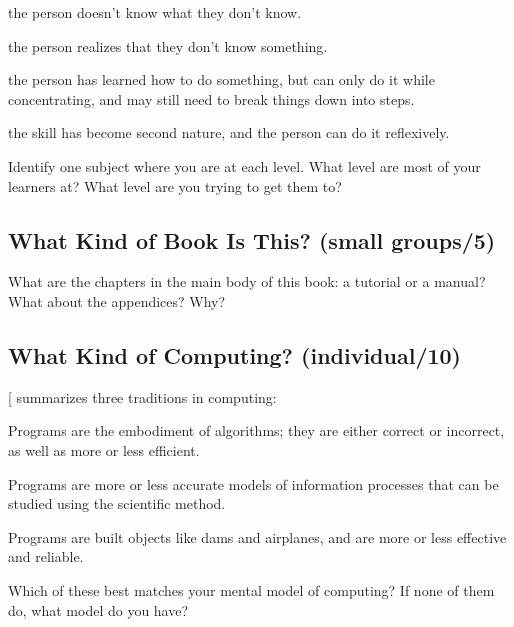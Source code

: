 \begin{description}
\tightlist
\item[Unconscious incompetence:]
the person doesn't know what they don't know.
\item[Conscious incompetence:]
the person realizes that they don't know something.
\item[Conscious competence:]
the person has learned how to do something, but can only do it while
concentrating, and may still need to break things down into steps.
\item[Unconscious competence:]
the skill has become second nature, and the person can do it
reflexively.
\end{description}

Identify one subject where you are at each level. What level are most of
your learners at? What level are you trying to get them to?

\subsection{What Kind of Book Is This? (small groups/5)}\label{what-kind-of-book-is-this-small-groups5}

What are the chapters in the main body of this book: a tutorial or a
manual? What about the appendices? Why?

\subsection{What Kind of Computing? (individual/10)}\label{what-kind-of-computing-individual10}

{[}\protect[\hyperlink{b:Tedr2008}{Tedr2008}]{]} summarizes three traditions in computing:

\begin{description}
\tightlist
\item[Mathematical:]
Programs are the embodiment of algorithms; they are either correct
or incorrect, as well as more or less efficient.
\item[Scientific:]
Programs are more or less accurate models of information processes
that can be studied using the scientific method.
\item[Engineering:]
Programs are built objects like dams and airplanes, and are more or
less effective and reliable.
\end{description}

Which of these best matches your mental model of computing? If none of
them do, what model do you have?

